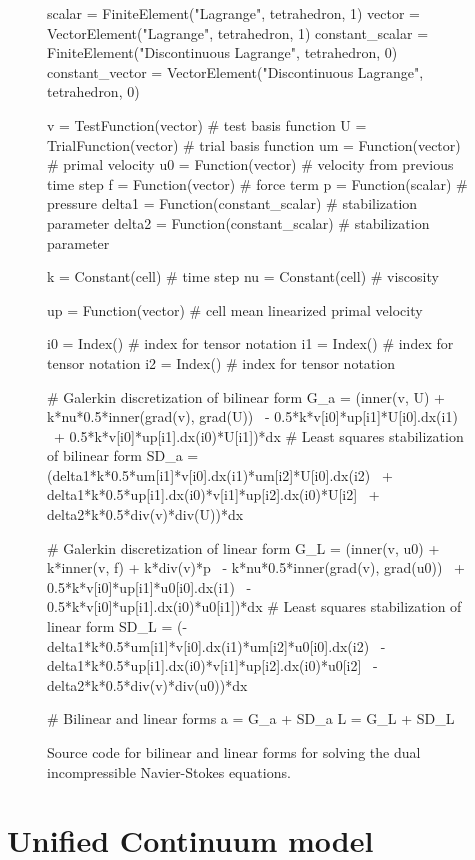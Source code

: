 \begin{figure}[!h]
\begin{python}
scalar = FiniteElement("Lagrange", tetrahedron, 1)
vector = VectorElement("Lagrange", tetrahedron, 1)
constant_scalar = FiniteElement("Discontinuous Lagrange", tetrahedron, 0)
constant_vector = VectorElement("Discontinuous Lagrange", tetrahedron, 0)

v      = TestFunction(vector)      # test basis function
U      = TrialFunction(vector)     # trial basis function
um     = Function(vector)          # primal velocity
u0     = Function(vector)          # velocity from previous time step
f      = Function(vector)          # force term
p      = Function(scalar)          # pressure
delta1 = Function(constant_scalar) # stabilization parameter
delta2 = Function(constant_scalar) # stabilization parameter

k  = Constant(cell)	# time step
nu = Constant(cell) # viscosity

up     = Function(vector) # cell mean linearized primal velocity

i0 = Index()    # index for tensor notation
i1 = Index()    # index for tensor notation
i2 = Index()    # index for tensor notation

# Galerkin discretization of bilinear form
G_a  = (inner(v, U) + k*nu*0.5*inner(grad(v), grad(U)) \
          - 0.5*k*v[i0]*up[i1]*U[i0].dx(i1) \
          + 0.5*k*v[i0]*up[i1].dx(i0)*U[i1])*dx
# Least squares stabilization of bilinear form
SD_a = (delta1*k*0.5*um[i1]*v[i0].dx(i1)*um[i2]*U[i0].dx(i2) \
           + delta1*k*0.5*up[i1].dx(i0)*v[i1]*up[i2].dx(i0)*U[i2] \
           + delta2*k*0.5*div(v)*div(U))*dx

# Galerkin discretization of linear form
G_L  = (inner(v, u0) + k*inner(v, f) + k*div(v)*p \
          - k*nu*0.5*inner(grad(v), grad(u0)) \
          + 0.5*k*v[i0]*up[i1]*u0[i0].dx(i1) \
          - 0.5*k*v[i0]*up[i1].dx(i0)*u0[i1])*dx
# Least squares stabilization of linear form
SD_L = (- delta1*k*0.5*um[i1]*v[i0].dx(i1)*um[i2]*u0[i0].dx(i2) \
           - delta1*k*0.5*up[i1].dx(i0)*v[i1]*up[i2].dx(i0)*u0[i2] \
           - delta2*k*0.5*div(v)*div(u0))*dx

# Bilinear and linear forms
a = G_a + SD_a
L = G_L + SD_L
\end{python}
\caption{Source code for bilinear and linear forms for solving the dual incompressible Navier-Stokes equations.}
\label{code:DUALICNS}
\end{figure}

\section{Unified Continuum model}

